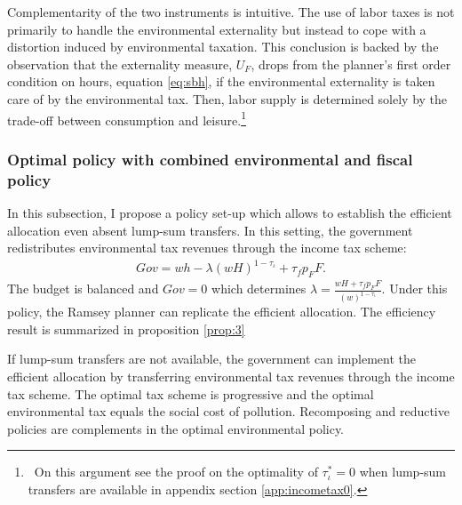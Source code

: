 Complementarity of the two instruments is intuitive. The use of labor taxes is not primarily to handle the environmental externality but instead to cope with a distortion induced by environmental taxation. 
This conclusion is backed by the observation that the externality measure, $U_F$, drops from the planner's first order condition on hours, equation \ref{eq:sbh}, if the environmental externality is taken care of by the environmental tax. Then, labor supply is determined solely by the trade-off between consumption and leisure.\footnote{\ On this argument see the proof on the optimality of $\tau_\iota^*=0$ when lump-sum transfers are available in appendix section \ref{app:incometax0}.} 

 

 

\subsubsection{Optimal policy with combined environmental and fiscal policy}\label{subsec:integrated}

In this subsection, I propose a policy set-up which allows to establish the efficient allocation even absent lump-sum transfers. In this setting, the government redistributes environmental tax revenues through the income tax scheme:  
\begin{align}
Gov= wh-\lambda (wH)^{1-\tau_\iota}+\tau_f p_FF.
\end{align}
The budget is balanced and $Gov = 0$ which determines $\lambda=\frac{wH + \tau_f p_F F}{(w)^{1-\tau_{\iota}}}$. 
Under this policy, the Ramsey planner can replicate the efficient allocation. 
The efficiency result is summarized in proposition \ref{prop:3}

\begin{prop}\label{prop:3}
	If lump-sum transfers are not available, the government can implement the efficient allocation by  transferring environmental tax revenues through the income tax scheme. The optimal tax scheme is progressive and the optimal environmental tax equals the social cost of pollution. Recomposing and reductive policies are complements in the optimal environmental policy.
\end{prop}

